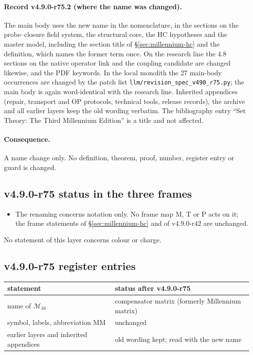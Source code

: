 \paragraph{Record v4.9.0-r75.2 (where the name was changed).}
The main body uses the new name in the nomenclature, in the sections on the probe--closure field system, the structural core,
the HC hypotheses and the master model, including the section title of \S\ref{sec:millennium-hc} and the definition, which
names the former term once.  On the research line the 4.8 sections on the native operator link and the coupling candidate are
changed likewise, and the PDF keywords.  In the local monolith the 27 main-body occurrences are changed by the patch list
\texttt{llm/revision\_spec\_\allowbreak v490\_\allowbreak r75.py}; the main body is again word-identical with the research
line.  Inherited appendices (repair, transport and OP protocols, technical tools, release records), the archive and all earlier
layers keep the old wording verbatim.  The bibliography entry ``Set Theory: The Third Millennium Edition'' is a title and not
affected.

\paragraph{Consequence.}
A name change only.  No definition, theorem, proof, number, register entry or guard is changed.

\subsection*{v4.9.0-r75 status in the three frames}
\label{subsec:v490-r75-frames}

\begin{itemize}[leftmargin=2em]
\item The renaming concerns notation only.  No frame map M, T or P acts on it; the frame statements of
\S\ref{sec:millennium-hc} and of v4.9.0-r42 are unchanged.
\end{itemize}
No statement of this layer concerns colour or charge.

\subsection*{v4.9.0-r75 register entries}
\label{subsec:v490-r75-register}

\begin{center}
\small
\begin{tabular}{@{}>{\raggedright\arraybackslash}p{}>{\raggedright\arraybackslash}p{}@{}}
\toprule
statement & status after v4.9.0-r75\\
\midrule
name of \(\mathcal M_{16}\) & compensator matrix (formerly Millennium matrix)\\
symbol, labels, abbreviation MM & unchanged\\
earlier layers and inherited appendices & old wording kept; read with the new name\\
\bottomrule
\end{tabular}
\end{center}

